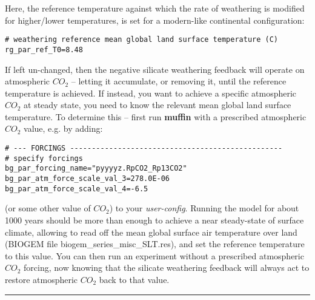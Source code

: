 Here, the reference temperature against which  the rate of weathering is modified for higher/lower temperatures, is set for a modern-like continental configuration:
\vspace{-1mm}\small\begin{verbatim}
# weathering reference mean global land surface temperature (C)
rg_par_ref_T0=8.48
\end{verbatim}\normalsize\vspace{-1mm}
If left un-changed, then the negative silicate weathering feedback will operate on atmospheric \(CO_{2}\) -- letting it accumulate, or removing it, until the reference temperature is achieved. If instead, you want to achieve a specific atmospheric \(CO_{2}\) at steady state, you need to know the relevant mean global land surface temperature. To determine this -- first run \textbf{muffin} with a prescribed atmospheric \(CO_{2}\) value, e.g. by adding:
\vspace{-1mm}\small\begin{verbatim}
# --- FORCINGS -------------------------------------------------
# specify forcings
bg_par_forcing_name="pyyyyz.RpCO2_Rp13CO2"
bg_par_atm_force_scale_val_3=278.0E-06
bg_par_atm_force_scale_val_4=-6.5
\end{verbatim}\normalsize\vspace{-1mm}
(or some other value of \(CO_{2}\)) to your \textit{user-config}. Running the model for about 1000 years should be more than enough to achieve a near steady-state of surface climate, allowing to read off the mean global surface air temperature over land (BIOGEM file \textsf{\footnotesize biogem\_series\_misc\_SLT.res}), and set the reference temperature to this value. You can then run an experiment without a prescribed atmospheric \(CO_{2}\) forcing, now knowing that the silicate weathering feedback will always act to restore atmospheric \(CO_{2}\) back to that value.

\vspace{1mm}
\noindent\rule{4cm}{0.5pt}
\vspace{2mm}


